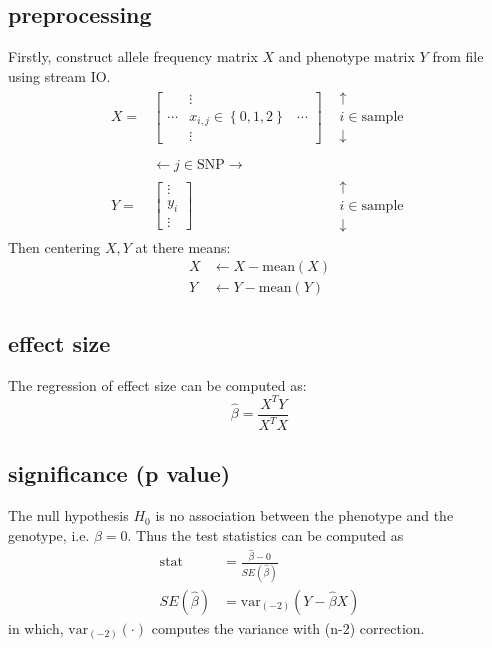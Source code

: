 \documentclass{article}
\begin{document}
\subsection{preprocessing}
Firstly, construct allele frequency matrix $X$ and phenotype matrix $Y$ from file using stream IO.
$$
\begin{matrix}X=&\left[ \begin{matrix}&\vdots &\\ \cdots &x_{i,j}\in \left\{ 0,1,2\right\}  &\cdots \\ &\vdots &\end{matrix} \right]  &\begin{gathered}\uparrow \\ i\in \text{sample} \\ \downarrow \end{gathered} \\ &&\\ &\leftarrow j\in \text{SNP} \rightarrow &\\ Y=&\left[ \begin{gathered}\vdots \\ y_{i}\\ \vdots \end{gathered} \right]  &\begin{gathered}\uparrow \\ i\in \text{sample} \\ \downarrow \end{gathered} \end{matrix}
$$
Then centering $X, Y$ at there means:
$$
\begin{aligned}X&\leftarrow X-\text{mean} \left( X\right)  \\ Y&\leftarrow Y-\text{mean} \left( Y\right)  \end{aligned} 
$$

\subsection{effect size}
The regression of effect size can be computed as:
$$
\hat{\beta} =\frac{X^{T}Y}{X^{T}X} 
$$

\subsection{significance (p value)}
The null hypothesis $H_0$ is no association between the phenotype and the genotype,
i.e. $\beta = 0$.
Thus the test statistics can be computed as
$$
\begin{aligned}
\text{stat} &=\frac{\hat{\beta } -0}{SE\left( \hat{\beta } \right)  } \\ 
SE\left( \hat{\beta } \right)  &=\text{var}_{(-2)} (Y-\hat{\beta} X)
\end{aligned}
$$
in which, $\text{var}_{(-2)}(\cdot)$ computes the variance with (n-2) correction.
\end{document}

